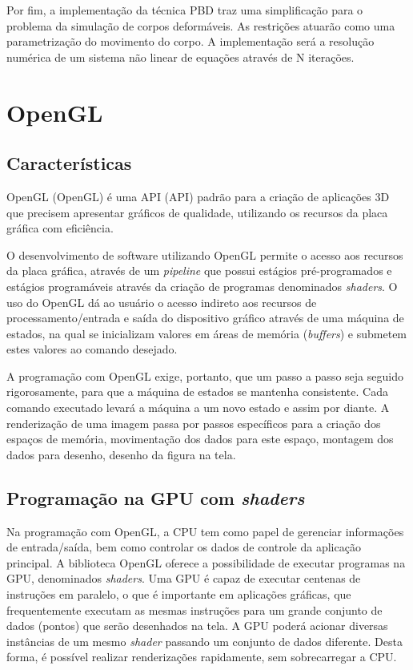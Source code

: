 Por fim, a implementação da técnica \ac{PBD} traz uma simplificação para o problema da simulação de corpos deformáveis. As restrições atuarão como uma parametrização do movimento do corpo. A implementação será a resolução numérica de um sistema não linear de equações através de N iterações.

\section{OpenGL}

\subsection{Características}

\acs{OpenGL} (\acl{OpenGL}) é uma \acs{API} (\acl{API}) padrão para a criação de aplicações 3D que precisem apresentar gráficos de qualidade, utilizando os recursos da placa gráfica com eficiência.

O desenvolvimento de software utilizando \acs{OpenGL} permite o acesso aos recursos da placa gráfica, através de um \textit{pipeline} que possui estágios pré-programados e estágios programáveis através da criação de programas denominados \textit{shaders}. O uso do \acs{OpenGL} dá ao usuário o acesso indireto aos recursos de processamento/entrada e saída do dispositivo gráfico através de uma máquina de estados, na qual se inicializam valores em áreas de memória (\textit{buffers}) e submetem estes valores ao comando desejado.

A programação com \acs{OpenGL} exige, portanto, que um passo a passo seja seguido rigorosamente, para que a máquina de estados se mantenha consistente. Cada comando executado levará a máquina a um novo estado e assim por diante. A renderização de uma imagem passa por passos específicos para a criação dos espaços de memória, movimentação dos dados para este espaço, montagem dos dados para desenho, desenho da figura na tela.

\subsection{Programação na GPU com \textit{shaders}}

Na programação com \acs{OpenGL}, a CPU tem como papel de gerenciar informações de entrada/saída, bem como controlar os dados de controle da aplicação principal. A biblioteca \acs{OpenGL} oferece a possibilidade de executar programas na \acs{GPU}, denominados \textit{shaders}. Uma \acs{GPU} é capaz de executar centenas de instruções em paralelo, o que é importante em aplicações gráficas, que frequentemente executam as mesmas instruções para um grande conjunto de dados (pontos) que serão desenhados na tela. A \acs{GPU} poderá acionar diversas instâncias de um mesmo \textit{shader} passando um conjunto de dados diferente. Desta forma, é possível realizar renderizações rapidamente, sem sobrecarregar a CPU. 

